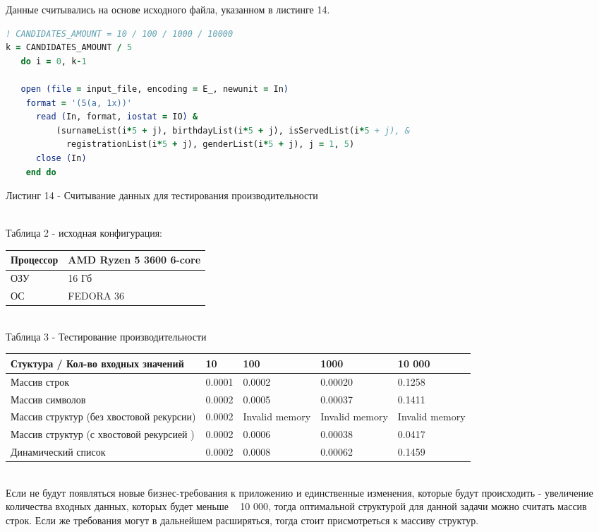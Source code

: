 \documentclass[12pt, a4paper]{report}
\begin{document}
Данные считывались на основе исходного файла, указанном в листинге 14.

\begin{lstlisting}[language=Fortran]
! CANDIDATES_AMOUNT = 10 / 100 / 1000 / 10000
k = CANDIDATES_AMOUNT / 5 
   do i = 0, k-1
   
   open (file = input_file, encoding = E_, newunit = In)
    format = '(5(a, 1x))'
      read (In, format, iostat = IO) & 
          (surnameList(i*5 + j), birthdayList(i*5 + j), isServedList(i*5 + j), &
            registrationList(i*5 + j), genderList(i*5 + j), j = 1, 5)
      close (In)
    end do
\end{lstlisting}

\begin{center}
Листинг 14 - Считывание данных для тестирования производительности
\end{center} \\

Таблица 2 - исходная конфигурация: \\
\begin{tabular}{ |p{3.5cm}|p{6cm}|}
\hline
Процессор & AMD Ryzen 5 3600 6-core \\
\hline
ОЗУ & 16 Гб \\
\hline
ОС & FEDORA 36 \\
\hline
\end{tabular} \\


Таблица 3 - Тестирование производительности \\
\begin{tabular}{ |p{3.5cm}|p{3cm}|p{3cm}|p{3cm}|p{3cm}|}
\hline
  Стуктура / Кол-во входных значений & 10 & 100 & 1000 & 10 000\\
\hline
Массив строк  & 0.0001 & 0.0002 & 0.00020 & 0.1258  \\
\hline
Массив символов  & 0.0002 & 0.0005 & 0.00037 & 0.1411 \\
\hline
Массив структур (без хвостовой рекурсии)  & 0.0002 & Invalid memory & Invalid memory &  Invalid memory \\
\hline
Массив структур (с хвостовой рекурсией )  & 0.0002 & 0.0006 & 0.00038 & 0.0417   \\
\hline
Динамический список & 0.0002 & 0.0008 & 0.00062 & 0.1459 \\
\hline
\end{tabular} \\

Если не будут появляться новые бизнес-требования к приложению и единственные изменения, которые будут происходить - увеличение количества входных данных, которых будет меньше  ~ 10 000, тогда оптимальной структурой для данной задачи можно считать массив строк. Если же требования могут в дальнейшем расширяться, тогда стоит присмотреться к массиву структур. 
\end{document}
